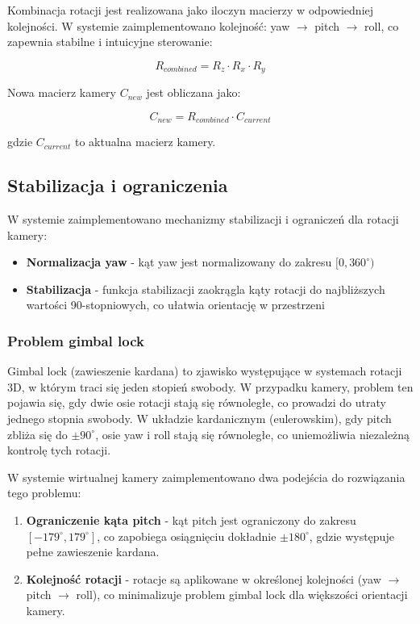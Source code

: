 \documentclass[a4paper,12pt]{article}
\begin{document}
Kombinacja rotacji jest realizowana jako iloczyn macierzy w odpowiedniej kolejności. W systemie zaimplementowano kolejność: yaw \(\rightarrow\) pitch \(\rightarrow\) roll, co zapewnia stabilne i intuicyjne sterowanie:

\[
R_{combined} = R_z \cdot R_x \cdot R_y
\]

Nowa macierz kamery \( C_{new} \) jest obliczana jako:

\[
C_{new} = R_{combined} \cdot C_{current}
\]

gdzie \( C_{current} \) to aktualna macierz kamery.

\subsection{Stabilizacja i ograniczenia}

W systemie zaimplementowano mechanizmy stabilizacji i ograniczeń dla rotacji kamery:

\begin{itemize}
    \item \textbf{Normalizacja yaw} - kąt yaw jest normalizowany do zakresu \([0, 360^\circ)\)
    \item \textbf{Stabilizacja} - funkcja stabilizacji zaokrągla kąty rotacji do najbliższych wartości 90-stopniowych, co ułatwia orientację w przestrzeni
\end{itemize}

\subsubsection{Problem gimbal lock}

Gimbal lock (zawieszenie kardana) to zjawisko występujące w systemach rotacji 3D, w którym traci się jeden stopień swobody. W przypadku kamery, problem ten pojawia się, gdy dwie osie rotacji stają się równoległe, co prowadzi do utraty jednego stopnia swobody. W układzie kardanicznym (eulerowskim), gdy pitch zbliża się do \(\pm 90^\circ\), osie yaw i roll stają się równoległe, co uniemożliwia niezależną kontrolę tych rotacji.

W systemie wirtualnej kamery zaimplementowano dwa podejścia do rozwiązania tego problemu:

\begin{enumerate}
    \item \textbf{Ograniczenie kąta pitch} - kąt pitch jest ograniczony do zakresu \([-179^\circ, 179^\circ]\), co zapobiega osiągnięciu dokładnie \(\pm 180^\circ\), gdzie występuje pełne zawieszenie kardana.
    
    \item \textbf{Kolejność rotacji} - rotacje są aplikowane w określonej kolejności (yaw \(\rightarrow\) pitch \(\rightarrow\) roll), co minimalizuje problem gimbal lock dla większości orientacji kamery.
\end{enumerate}
\end{document}
